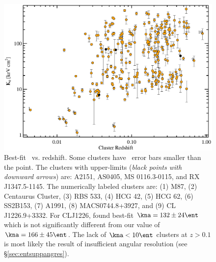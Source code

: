 \begin{figure}[htp]
  \begin{center}
    \begin{minipage}[htp]{0.9\linewidth}
      \includegraphics*[width=\textwidth, trim=5mm 0mm 5mm 5mm, clip]{k0res.eps}
      \caption[Best-fit \kna\ vs. redshift.]{Best-fit \kna\ vs. redshift. Some clusters have
        \kna\ error bars smaller than the point. The clusters with
        upper-limits ({\it{black points with downward arrows}}) are:
        A2151, AS0405, MS 0116.3-0115, and RX J1347.5-1145. The
        numerically labeled clusters are: (1) M87, (2) Centaurus
        Cluster, (3) RBS 533, (4) HCG 42, (5) HCG 62, (6) SS2B153, (7)
        A1991, (8) MACS0744.8+3927, and (9) CL J1226.9+3332. For
        CLJ1226, \cite{2007ApJ...659.1125M} found best-fit $\kna = 132
        \pm 24 \ent$ which is not significantly different from our
        value of $\kna = 166 \pm 45 \ent$. The lack of $\kna < 10
        \ent$ clusters at $z > 0.1$ is most likely the result of
        insufficient angular resolution (see \S\ref{sec:entsuppangres}).}
      \label{fig:k0res}
    \end{minipage}
  \end{center}
\end{figure}

